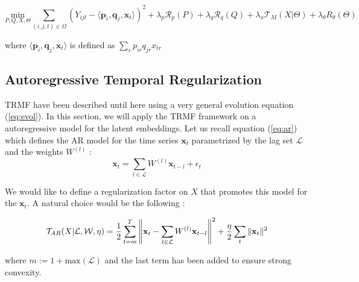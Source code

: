 \documentclass{article}
\begin{document}
\begin{equation}
\underset{P,Q,X,\Theta}{\text{min}} \sum_{(i,j,t) \in \Omega} (Y_{ijt} - \langle \mathbf{p}_i,\mathbf{q}_j,\mathbf{x}_t \rangle )^2 + \lambda_p \mathcal{R}_p(P) + \lambda_q \mathcal{R}_q(Q) + \lambda_x \mathcal{T}_M(X | \Theta) + \lambda_{\theta} R_{\theta}(\Theta)
\label{eq:model_tensor}
\end{equation}

where $\langle \mathbf{p}_i,\mathbf{q}_j,\mathbf{x}_t \rangle$ is defined as $\sum_r p_{ir}q_{jr}x_{tr}$

\subsection*{Autoregressive Temporal Regularization}
TRMF have been described until here using a very general evolution equation (\ref{eq:evol}). In this section, we will apply the TRMF framework on a autoregressive model for the latent embeddings. Let us recall equation (\ref{eq:ar}) which defines the AR model for the time series $\mathbf{x}_t$ parametrized by the lag set $\mathcal{L}$ and the weights $W^{(l)}$ :
$$\mathbf{x}_t = \sum_{l \in \mathcal{L}} W^{(l)} \mathbf{x}_{t-l} + \epsilon_t$$

We would like to define a regularization factor on $X$ that promotes this model for the $\mathbf{x}_t$. A natural choice would be the following :

\begin{equation}
\mathcal{T}_{AR}(X|\mathcal{L}, \mathcal{W}, \eta) = \frac{1}{2} \sum_{t=m}^T \left\lVert\mathbf{x}_t - \sum_{l \in \mathcal{L}} W^{(l)} \mathbf{x}_{t-l}\right\rVert^2 + \frac{\eta}{2} \sum_t \|\mathbf{x}_t\|^2
\label{eq:tar}
\end{equation}

where $m := 1+\text{max}(\mathcal{L})$ and the last term has been added to ensure strong convexity. \\
\end{document}
